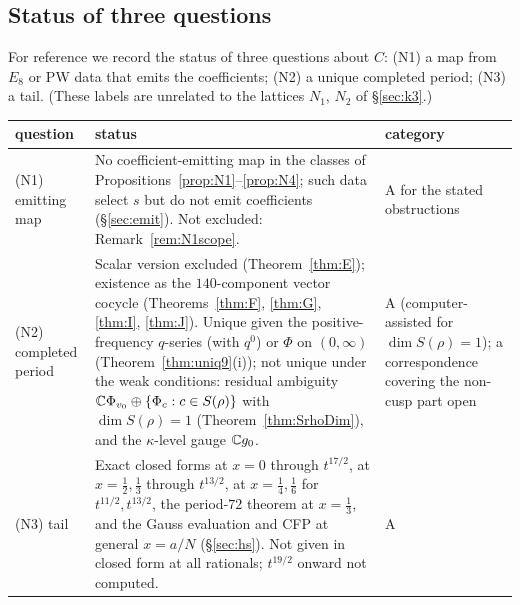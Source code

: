 \subsection{Status of three questions}\label{sec:three}
For reference we record the status of three questions about $C$: \textsf{(N1)} a map from $E_8$ or PW data that emits the coefficients; \textsf{(N2)} a unique
completed period; \textsf{(N3)} a tail. (These labels are unrelated to the lattices $N_1$, $N_2$ of \S\ref{sec:k3}.)
\begin{center}\small
\begin{longtable}{p{2.2cm}p{8.6cm}p{3.9cm}}\toprule
question & status & category\\\midrule\endhead
\textsf{(N1)} emitting map & No coefficient-emitting map in the classes of Propositions~\ref{prop:N1}--\ref{prop:N4}; such data select $s$ but do not emit coefficients (\S\ref{sec:emit}). Not excluded: Remark~\ref{rem:N1scope}. & A for the stated obstructions\\
\textsf{(N2)} completed period & Scalar version excluded (Theorem~\ref{thm:E}); existence as the $140$-component vector cocycle (Theorems~\ref{thm:F}, \ref{thm:G}, \ref{thm:I}, \ref{thm:J}). Unique given the positive-frequency $q$-series (with $q^0$) or $\Phi$ on $(0,\infty)$ (Theorem~\ref{thm:uniq9}(i)); not unique under the weak conditions: residual ambiguity $\mathbb{C}\Phi_{v_0}\oplus\{\Phi_c:c\in S(\rho)\}$ with $\dim S(\rho)=1$ (Theorem~\ref{thm:SrhoDim}), and the $\kappa$-level gauge $\mathbb{C} g_0$. & A (computer-assisted for $\dim S(\rho)=1$); a correspondence covering the non-cusp part open\\
\textsf{(N3)} tail & Exact closed forms at $x=0$ through $t^{17/2}$, at $x=\tfrac12,\tfrac13$ through $t^{13/2}$, at $x=\tfrac14,\tfrac16$ for $t^{11/2},t^{13/2}$, the period-$72$ theorem at $x=\tfrac13$, and the Gauss evaluation and CFP at general $x=a/N$ (\S\ref{sec:hs}). Not given in closed form at all rationals; $t^{19/2}$ onward not computed. & A\\\bottomrule
\end{longtable}
\end{center}
